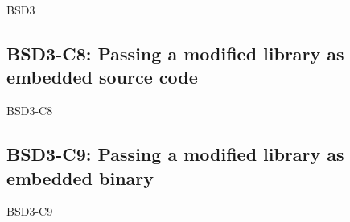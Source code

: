 \begin{license}{BSD3}
\subsection{BSD3-C8: Passing a modified library as embedded source code}
\begin{lsuc}{BSD3-C8}

  \lsucmeans{\useCaseEight}
  \lsuccovers{\coversEight}

  \begin{lsucrequires}
    \lsucmandatory{\keepLicenseElements}
    \lsucoptional{\addLibraryLicenseToCopyrightMessage}
    \lsucoptional{\keepSourcesSeparate}
  \end{lsucrequires}

  \begin{lsucprohibits}
    \lsucitem{\dontUseAuthorNames}%
  \end{lsucprohibits}
\end{lsuc}

\subsection{BSD3-C9: Passing a modified library as embedded binary}
\begin{lsuc}{BSD3-C9}

  \lsucmeans{\useCaseNine}
  \lsuccovers{\coversNine}

  \begin{lsucrequires}
    \lsucmandatory{\insertLicenseIntoBinary}\passingFilesCorrectly
    \lsucoptional{\addLibraryLicenseToCopyrightMessage}
    \lsucoptional{\keepBinariesSeparate}
  \end{lsucrequires}

  \begin{lsucprohibits}
    \lsucitem{\dontUseAuthorNames}%
  \end{lsucprohibits}
\end{lsuc}

\end{license}


